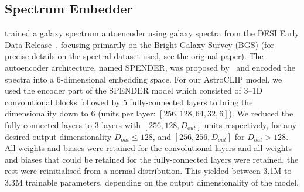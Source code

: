 \subsection{Spectrum Embedder}\label{subsec:spectrum-embedder}
\cite{liang2023} trained a galaxy spectrum autoencoder using galaxy spectra from the DESI Early Data Release~\citep{desiearly2023},
focusing primarily on the Bright Galaxy Survey (BGS) (for precise details on the spectral dataset used, see the original paper).
The autoencoder architecture, named SPENDER, was proposed by~\cite{melchior2022} and encoded the spectra into a 6-dimensional
embedding space.
For our AstroCLIP model, we used the encoder part of the SPENDER model which consisted of 3--1D convolutional blocks
followed by 5 fully-connected layers to bring the dimensionality down to 6 (units per layer: $[256, 128, 64, 32, 6]$).
We reduced the fully-connected layers to 3 layers with $[256, 128, D_{out}]$ units respectively, for any desired
output dimensionality $D_{out} \leq 128$, and $[256, 256, D_{out}]$ for $D_{out} > 128$.
All weights and biases were retained for the convolutional layers and all weights and biases that could be retained for the
fully-connected layers were retained, the rest were reinitialised from a normal distribution.
This yielded between 3.1M to 3.3M trainable parameters, depending on the output dimensionality of the model.
